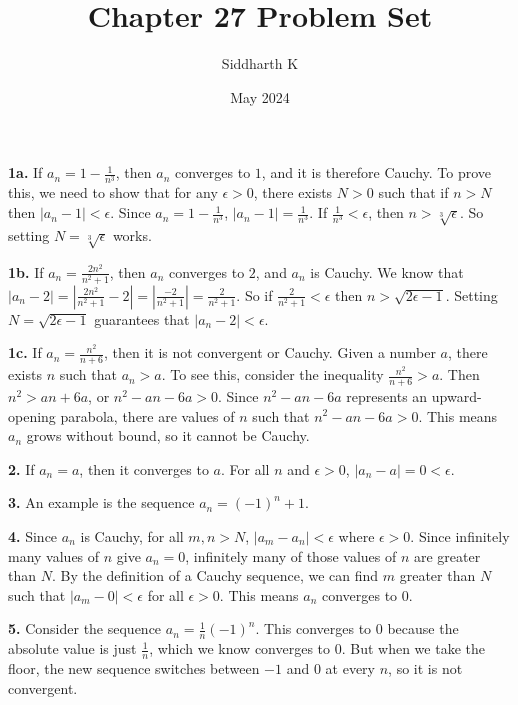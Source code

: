 \documentclass{article}
\title{Chapter 27 Problem Set}
\author{Siddharth K}
\date{May 2024}
\begin{document}
\maketitle

\textbf{1a.} If $a_n = 1 - \frac{1}{n^3}$, then $a_n$ converges to $1$, and it is therefore Cauchy. To prove this, we need to show that for any $\epsilon > 0$, there exists $N > 0$ such that if $n > N$ then $|a_n - 1| < \epsilon$. Since $a_n = 1 - \frac{1}{n^3}$, $|a_n - 1| = \frac{1}{n^3}$. If $\frac{1}{n^3} < \epsilon$, then $n > \sqrt[3]{\epsilon}$. So setting $N = \sqrt[3]{\epsilon}$ works.
\newline

\textbf{1b.} If $a_n = \frac{2n^2}{n^2 + 1}$, then $a_n$ converges to $2$, and $a_n$ is Cauchy. We know that $|a_n - 2| = |\frac{2n^2}{n^2 + 1} - 2| = |\frac{-2}{n^2 + 1}| = \frac{2}{n^2 + 1}$. So if $\frac{2}{n^2 + 1} < \epsilon$ then $n > \sqrt{2\epsilon - 1}$. Setting $N = \sqrt{2\epsilon - 1}$ guarantees that $|a_n - 2| < \epsilon$.
\newline

\textbf{1c.} If $a_n = \frac{n^2}{n + 6}$, then it is not convergent or Cauchy. Given a number $a$, there exists $n$ such that $a_n > a$. To see this, consider the inequality $\frac{n^2}{n + 6} > a$. Then $n^2 > an + 6a$, or $n^2 - an - 6a > 0$. Since $n^2 - an - 6a$ represents an upward-opening parabola, there are values of $n$ such that $n^2 - an - 6a > 0$. This means $a_n$ grows without bound, so it cannot be Cauchy.
\newline

\textbf{2.} If $a_n = a$, then it converges to $a$. For all $n$ and $\epsilon > 0$, $|a_n - a| = 0 < \epsilon$.
\newline

\textbf{3.} An example is the sequence $a_n = (-1)^n + 1$.
\newline

\textbf{4.} Since $a_n$ is Cauchy, for all $m, n > N$, $|a_m - a_n| < \epsilon$ where $\epsilon > 0$. Since infinitely many values of $n$ give $a_n = 0$, infinitely many of those values of $n$ are greater than $N$. By the definition of a Cauchy sequence, we can find $m$ greater than $N$ such that $|a_m - 0| < \epsilon$ for all $\epsilon > 0$. This means $a_n$ converges to $0$.
\newline

\textbf{5.} Consider the sequence $a_n = \frac{1}{n}(-1)^n$. This converges to $0$ because the absolute value is just $\frac{1}{n}$, which we know converges to $0$. But when we take the floor, the new sequence switches between $-1$ and $0$ at every $n$, so it is not convergent.
\newline
\end{document}
